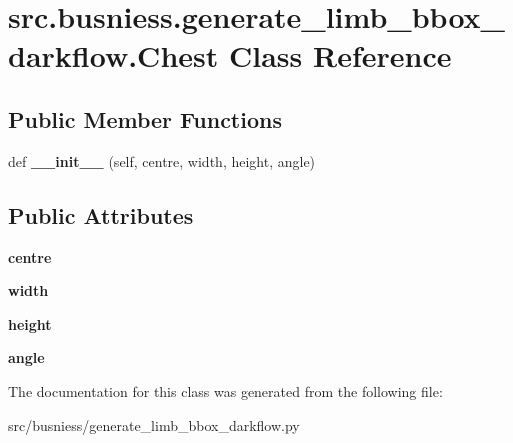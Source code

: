 \hypertarget{classsrc_1_1busniess_1_1generate__limb__bbox__darkflow_1_1_chest}{}\section{src.\+busniess.\+generate\+\_\+limb\+\_\+bbox\+\_\+darkflow.\+Chest Class Reference}
\label{classsrc_1_1busniess_1_1generate__limb__bbox__darkflow_1_1_chest}
\subsection*{Public Member Functions}
\begin{DoxyCompactItemize}
\item 
\mbox{\label{classsrc_1_1busniess_1_1generate__limb__bbox__darkflow_1_1_chest_a7c2941926139d7180d0911e0ea889a3d}} 
def {\bfseries \+\_\+\+\_\+init\+\_\+\+\_\+} (self, centre, width, height, angle)
\end{DoxyCompactItemize}
\subsection*{Public Attributes}
\begin{DoxyCompactItemize}
\item 
\mbox{\label{classsrc_1_1busniess_1_1generate__limb__bbox__darkflow_1_1_chest_a25560c14b3f8934c19a0009b6195dba7}} 
{\bfseries centre}
\item 
\mbox{\label{classsrc_1_1busniess_1_1generate__limb__bbox__darkflow_1_1_chest_ab77b94a978b6f3101740aeb0812ea567}} 
{\bfseries width}
\item 
\mbox{\label{classsrc_1_1busniess_1_1generate__limb__bbox__darkflow_1_1_chest_a3fb720f3bd7f4d7fee4e876557a348c6}} 
{\bfseries height}
\item 
\mbox{\label{classsrc_1_1busniess_1_1generate__limb__bbox__darkflow_1_1_chest_a2918976d22f9c4d283fb9f81f2275ae6}} 
{\bfseries angle}
\end{DoxyCompactItemize}


The documentation for this class was generated from the following file\+:\begin{DoxyCompactItemize}
\item 
src/busniess/generate\+\_\+limb\+\_\+bbox\+\_\+darkflow.\+py\end{DoxyCompactItemize}
